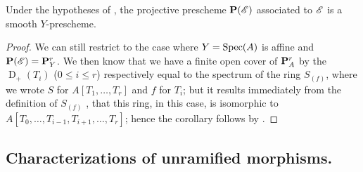 \begin{corollary}[17.3.9]
\label{IV.17.3.9}
Under the hypotheses of , the projective prescheme $\mathbf{P}(\mathscr{E})$  associated to $\mathscr{E}$ is a smooth $Y$-prescheme.
\end{corollary}

\begin{proof}
We can still restrict to the case where $Y = {\mathop{\mathrm{Spec}}\nolimits}(A)$ is affine and $\mathbf{P}(\mathscr{E}) = \mathbf{P}^r_{Y}$.
We then know  that we have a finite open cover of $\mathbf{P}^r_{A}$ by the $\operatorname{D}_+(T_i)$ ($0\leq i \leq r$) respectively equal to the spectrum of the ring $S_{(f)}$, where we wrote $S$ for $A[T_1, \ldots, T_r]$ and $f$ for $T_i$; but it results immediately from the definition of $S_{(f)}$ , that this ring, in this case, is isomorphic to $A[T_0, \ldots, T_{i-1}, T_{i+1}, \ldots, T_r]$; hence the corollary follows by .
\end{proof}

\subsection{Characterizations of unramified morphisms.}
\label{subection:IV.17.4}
